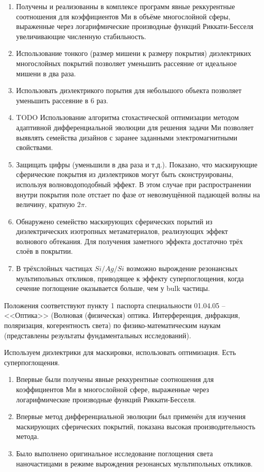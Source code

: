 \begin{enumerate}
  \item Получены и реализованны в комплексе программ явные
    реккурентные соотношения для коэффициентов Ми в объёме
    многослойной сферы, выраженные через логарифмические производные
    функций Риккати-Бесселя увеличивающие численную стабильность.  
  
  \item Использование тонкого (размер мишени к размеру покрытия) диэлектриких многослойных покрытий позволяет
    уменьшить рассеяние от идеальное мишени в два раза.
  \item Использовать диэлектрикого порытия для небольшого объекта
    позволяет уменьшить рассеяние в 6 раз.

  \item TODO Использование алгоритма стохастической оптимизации методом
    адаптивной дифференциальной эволюции для решения задачи Ми
    позволяет выявлять семейства дизайнов с заранее заданными
    электромагнитными свойствами.

  \item Защищать цифры (уменьшили в два раза и т.д.). Показано, что
    маскирующие сферические покрытия из диэлектриков могут быть
    сконструированы, используя волноводоподобный эффект.  В этом
    случае при распространении внутри покрытия поле отстает по фазе от
    невозмущённой падающей волны на величину, кратную $2\pi$.
  \item Обнаружено семейство маскирующих сферических порытий из
    диэлектрических изотропных метаматериалов, реализующих эффект
    волнового обтекания.  Для получения заметного эффекта достаточно
    трёх слоёв в покрытии.
  \item В трёхслойных частицах $Si/Ag/Si$ возможно вырождение
    резонансных мультипольных откликов, приводящее к эффекту
    суперпоглощения, когда сечение поглощение оказывается больше, чем
    у bulk частицы. 
  \end{enumerate}

Положения соответствуют пункту 1 паспорта специальности 01.04.05 --
<<Оптика>> (Волновая (физическая) оптика. Интерференция, дифракция,
поляризация, когерентность света) по физико-математическим
наукам (представлены результаты фундаментальных исследований).

\vspace{5.5em}
\novelty Используем диэлектрики для маскировки, использовать
оптимизация. Есть суперпоглощения.
\begin{enumerate}
  \item Впервые были получены явные реккурентные соотношения для
    коэффициентов Ми в многослойной сфере, выраженные через
    логарифмические производные функций Риккати-Бесселя. 
  \item Впервые метод дифференциальной эволюции был применён
    для изучения маскирующих сферических покрытий, показана высокая
    производительность метода.
  \item Было выполнено оригинальное исследование поглощения света
    наночастицами в режиме вырождения резонансых мультипольных откликов.
\end{enumerate}

